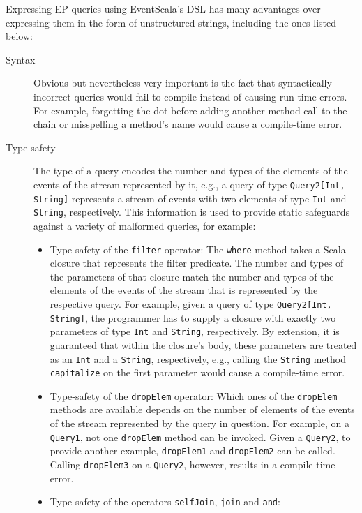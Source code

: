 \documentclass[article, 10pt, type=bsc, colorback, accentcolor=tud8b, parskip=half, bibliography=totocnumbered]{tudthesis}
\begin{document}
Expressing EP queries using EventScala's DSL has many advantages over expressing them in the form of unstructured strings, including the ones listed below:

\begin{description}
\item[Syntax]
Obvious but nevertheless very important is the fact that syntactically incorrect queries would fail to compile instead of causing run-time errors.
For example, forgetting the dot before adding another method call to the chain or misspelling a method's name would cause a compile-time error.
\item[Type-safety]
The type of a query encodes the number and types of the elements of the events of the stream represented by it, e.g., a query of type \lstinline{Query2[Int, String]} represents a stream of events with two elements of type \lstinline{Int} and \lstinline{String}, respectively.
This information is used to provide static safeguards against a variety of malformed queries, for example:
\begin{itemize}
\item
Type-safety of the \lstinline{filter} operator:
The \lstinline{where} method takes a Scala closure that represents the filter predicate.
The number and types of the parameters of that closure match the number and types of the elements of the events of the stream that is represented by the respective query.
For example, given a query of type \lstinline{Query2[Int, String]}, the programmer has to supply a closure with exactly two parameters of type \lstinline{Int} and \lstinline{String}, respectively.
By extension, it is guaranteed that within the closure's body, these parameters are treated as an \lstinline{Int} and a \lstinline{String}, respectively, e.g., calling the \lstinline{String} method \lstinline{capitalize} on the first parameter would cause a compile-time error.
\item
Type-safety of the \lstinline{dropElem} operator:
Which ones of the \lstinline{dropElem} methods are available depends on the number of elements of the events of the stream represented by the query in question.
For example, on a \lstinline{Query1}, not one \lstinline{dropElem} method can be invoked.
Given a \lstinline{Query2}, to provide another example, \lstinline{dropElem1} and \lstinline{dropElem2} can be called.
Calling \lstinline{dropElem3} on a \lstinline{Query2}, however, results in a compile-time error.
\item
Type-safety of the operators \lstinline{selfJoin}, \lstinline{join} and \lstinline{and}:

\end{itemize}
\end{description}
\end{document}
